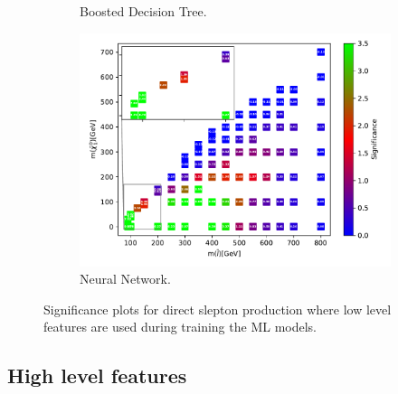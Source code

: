 \begin{figure}[H]
\begin{subfigure}[t!]{0.49\textwidth}
    \caption{Boosted Decision Tree.}
        \label{fig:signLowSlepSlepBDT}
    \end{subfigure}      
    \begin{subfigure}[t!]{0.49\textwidth}
    \includegraphics[width = \textwidth]{Figures/Significances/significance_NN_slepslep_Low_level.pdf}
    \caption{Neural Network.}
        \label{fig:signLowSlepSlepNN}
    \end{subfigure}
    \caption{Significance plots for direct slepton production where low level features are used during training the ML models.}
    \label{fig:signLowSlepSlep}
\end{figure}


\subsection{High level features}

